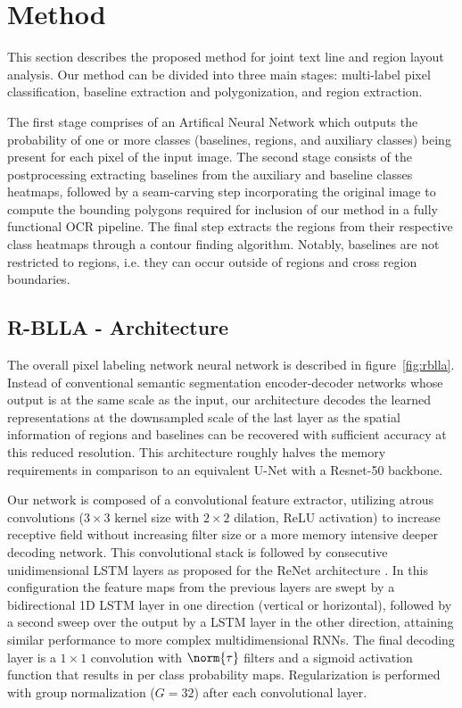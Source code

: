 \section{Method}


This section describes the proposed method for joint text line and region
layout analysis. Our method can be divided into three main stages: multi-label
pixel classification, baseline extraction and polygonization, and region
extraction.

The first stage comprises of an Artifical Neural Network which outputs the
probability of one or more classes (baselines, regions, and auxiliary classes)
being present for each pixel of the input image. The second stage consists of
the postprocessing extracting baselines from the auxiliary and baseline classes
heatmaps, followed by a seam-carving step incorporating the original image to
compute the bounding polygons required for inclusion of our method in a fully
functional OCR pipeline.  The final step extracts the regions from their
respective class heatmaps through a contour finding algorithm. Notably,
baselines are not restricted to regions, i.e. they can occur outside of regions
and cross region boundaries. 

\subsection{R-BLLA - Architecture}

The overall pixel labeling network neural network is described in figure~\ref{fig:rblla}. Instead of conventional semantic segmentation encoder-decoder
networks whose output is at the same scale as the input, our architecture
decodes the learned representations at the downsampled scale of the last layer
as the spatial information of regions and baselines can be recovered with
sufficient accuracy at this reduced resolution. This architecture roughly
halves the memory requirements in comparison to an equivalent U-Net with a
Resnet-50 backbone.

Our network is composed of a convolutional feature extractor, utilizing atrous
convolutions ($3 \times 3$ kernel size with $2 \times 2$ dilation, ReLU
activation) to increase receptive field without increasing filter size or a
more memory intensive deeper decoding network. This convolutional stack is
followed by consecutive unidimensional LSTM layers as proposed for the ReNet
architecture \cite{visin2015renet}. In this configuration the feature maps from
the previous layers are swept by a bidirectional 1D LSTM layer in one direction
(vertical or horizontal), followed by a second sweep over the output by a LSTM
layer in the other direction, attaining similar performance to more complex
multidimensional RNNs. The final decoding layer is a $1\times 1$ convolution
with $\norm{\tau}$ filters and a sigmoid activation function that results in
per class probability maps.  Regularization is performed with group
normalization ($G=32$) \cite{DBLP:journals/corr/abs-1803-08494} after each
convolutional layer.

